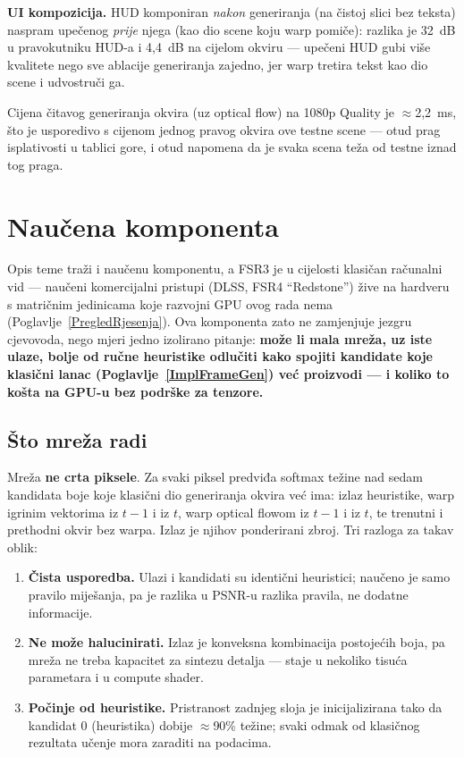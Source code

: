 \documentclass{mathos}
\begin{document}
\textbf{UI kompozicija.} HUD komponiran \emph{nakon} generiranja (na čistoj
slici bez teksta) naspram upečenog \emph{prije} njega (kao dio scene koju
warp pomiče): razlika je 32~dB u pravokutniku HUD-a i 4,4~dB na cijelom
okviru — upečeni HUD gubi više kvalitete nego sve ablacije generiranja
zajedno, jer warp tretira tekst kao dio scene i udvostruči ga.

Cijena čitavog generiranja okvira (uz optical flow) na 1080p Quality je
$\approx$2,2~ms, što je usporedivo s cijenom jednog pravog okvira ove
testne scene — otud prag isplativosti u tablici gore, i otud napomena da je
svaka scena teža od testne iznad tog praga.


\chapter{Naučena komponenta}\label{NaucenaKomponenta}

Opis teme traži i naučenu komponentu, a FSR3 je u cijelosti klasičan
računalni vid — naučeni komercijalni pristupi (DLSS, FSR4 ``Redstone'')
žive na hardveru s matričnim jedinicama koje razvojni GPU ovog rada nema
(Poglavlje~\ref{PregledRjesenja}). Ova komponenta zato ne zamjenjuje jezgru
cjevovoda, nego mjeri jedno izolirano pitanje: \textbf{može li mala mreža,
uz iste ulaze, bolje od ručne heuristike odlučiti kako spojiti kandidate
koje klasični lanac (Poglavlje~\ref{ImplFrameGen}) već proizvodi — i koliko
to košta na GPU-u bez podrške za tenzore.}

\section{Što mreža radi}

Mreža \textbf{ne crta piksele}. Za svaki piksel predviđa softmax težine nad
sedam kandidata boje koje klasični dio generiranja okvira već ima: izlaz
heuristike, warp igrinim vektorima iz $t-1$ i iz $t$, warp optical flowom
iz $t-1$ i iz $t$, te trenutni i prethodni okvir bez warpa. Izlaz je njihov
ponderirani zbroj. Tri razloga za takav oblik:

\begin{enumerate}
\item \textbf{Čista usporedba.} Ulazi i kandidati su identični heuristici;
naučeno je samo pravilo miješanja, pa je razlika u PSNR-u razlika pravila,
ne dodatne informacije.
\item \textbf{Ne može halucinirati.} Izlaz je konveksna kombinacija
postojećih boja, pa mreža ne treba kapacitet za sintezu detalja — staje u
nekoliko tisuća parametara i u compute shader.
\item \textbf{Počinje od heuristike.} Pristranost zadnjeg sloja je
inicijalizirana tako da kandidat 0 (heuristika) dobije $\approx$90\%
težine; svaki odmak od klasičnog rezultata učenje mora zaraditi na
podacima.
\end{enumerate}
\end{document}
